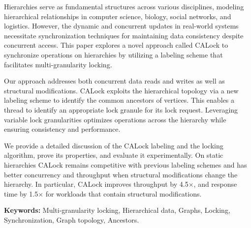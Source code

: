 %
\label{chap:abstract}

\vspace*{8mm}
Hierarchies serve as fundamental structures across various disciplines, modeling hierarchical relationships in computer science, biology, social networks, and logistics. However, the dynamic and concurrent updates in real-world systems necessitate synchronization techniques for maintaining data consistency despite concurrent access. This paper explores a novel approach called CALock to synchronize operations on hierarchies by utilizing a labeling scheme that facilitates multi-granularity locking.

Our approach addresses both concurrent data reads and writes as well as structural modifications. CALock exploits the hierarchical topology via a new labeling scheme to identify the common ancestors of vertices. This enables a thread to identify an appropriate lock granule for its lock request. Leveraging variable lock granularities optimizes operations across the hierarchy while ensuring consistency and performance.

We provide a detailed discussion of the CALock labeling and the locking algorithm, prove its properties, and evaluate it experimentally. On static hierarchies CALock remains competitive with previous labeling schemes and has better concurrency and throughput when structural modifications change the hierarchy. In particular, CALock improves throughput by 4.5$\times$, and response time by 1.5$\times$ for workloads that contain structural modifications.

\textbf{Keywords:} 
Multi-granularity locking, Hierarchical data, Graphs, Locking, Synchronization, Graph topology, Ancestors. 